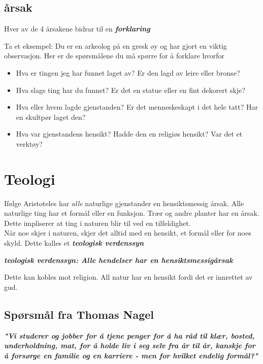 \documentclass[11pt, a4paper]{article}
\begin{document}
\subsection{årsak}

Hver av de 4 årsakene bidrar til en \textbf{\textit{forklaring}}

Ta et eksempel:
Du er en arkeolog på en gresk øy og har gjort en viktig observasjon. Her er de spørsmålene du må spørre for å forklare hvorfor

\begin{itemize}
    \item Hva er tingen jeg har funnet laget av? Er den lagd av leire eller bronse?
    \item Hva slags ting har du funnet? Er det en statue eller en fint dekorert skje?
    \item Hva eller hvem lagde gjenstanden? Er det menneskeskapt i det hele tatt? Har en skultpør laget den?
    \item Hva var gjenstandens hensikt? Hadde den en religiøs hensikt? Var det et verktøy?
\end{itemize}


\section{Teologi}

Ifølge Aristoteles har \textit{alle} naturlige gjenstander en hensiktsmessig årsak. Alle naturlige ting har et formål eller en funksjon. Trær og andre planter har en årsak. Dette impliserer at ting i naturen blir til ved en tilfeldighet.\\

Når noe skjer i naturen, skjer det alltid med en hensikt, et formål eller for noes skyld. Dette kalles et \textbf{\textit{teologisk verdenssyn}}

\textbf{\textit{teologisk verdenssyn: Alle hendelser har en hensiktsmessigårsak}}

Dette kan kobles mot religion. All natur har en hensikt fordi det er innrettet av gud.\\


\subsection{Spørsmål fra Thomas Nagel}

\textbf{\textit{"Vi studerer og jobber for å tjene penger for å ha råd til klær, bosted, underholdning, mat, for å holde liv i seg selv fra år til år, kanskje for å forsørge en familie og en karriere - men for hvilket endelig formål?"}}
\end{document}
